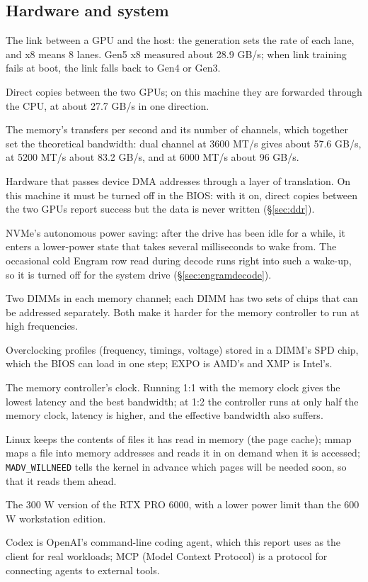 \documentclass[11pt,a4paper]{article}
\newcommand{\code}[1]{\texttt{#1}}
\begin{document}
\subsection*{Hardware and system}
\begin{description}\small
  \item[PCIe 5.0 x8, Gen3/4/5] The link between a GPU and the host: the generation sets the rate of each lane, and x8 means 8 lanes. Gen5 x8 measured about 28.9 GB/s; when link training fails at boot, the link falls back to Gen4 or Gen3.
  \item[P2P] Direct copies between the two GPUs; on this machine they are forwarded through the CPU, at about 27.7 GB/s in one direction.
  \item[MT/s, dual channel] The memory's transfers per second and its number of channels, which together set the theoretical bandwidth: dual channel at 3600 MT/s gives about 57.6 GB/s, at 5200 MT/s about 83.2 GB/s, and at 6000 MT/s about 96 GB/s.
  \item[IOMMU] Hardware that passes device DMA addresses through a layer of translation. On this machine it must be turned off in the BIOS: with it on, direct copies between the two GPUs report success but the data is never written (\S\ref{sec:ddr}).
  \item[APST] NVMe's autonomous power saving: after the drive has been idle for a while, it enters a lower-power state that takes several milliseconds to wake from. The occasional cold Engram row read during decode runs right into such a wake-up, so it is turned off for the system drive (\S\ref{sec:engramdecode}).
  \item[2DPC, dual rank] Two DIMMs in each memory channel; each DIMM has two sets of chips that can be addressed separately. Both make it harder for the memory controller to run at high frequencies.
  \item[EXPO, XMP] Overclocking profiles (frequency, timings, voltage) stored in a DIMM's SPD chip, which the BIOS can load in one step; EXPO is AMD's and XMP is Intel's.
  \item[UCLK] The memory controller's clock. Running 1:1 with the memory clock gives the lowest latency and the best bandwidth; at 1:2 the controller runs at only half the memory clock, latency is higher, and the effective bandwidth also suffers.
  \item[Page cache, mmap, MADV\_WILLNEED] Linux keeps the contents of files it has read in memory (the page cache); mmap maps a file into memory addresses and reads it in on demand when it is accessed; \code{MADV\_WILLNEED} tells the kernel in advance which pages will be needed soon, so that it reads them ahead.
  \item[Max-Q] The 300 W version of the RTX PRO 6000, with a lower power limit than the 600 W workstation edition.
  \item[Codex, MCP] Codex is OpenAI's command-line coding agent, which this report uses as the client for real workloads; MCP (Model Context Protocol) is a protocol for connecting agents to external tools.
\end{description}
\end{document}
